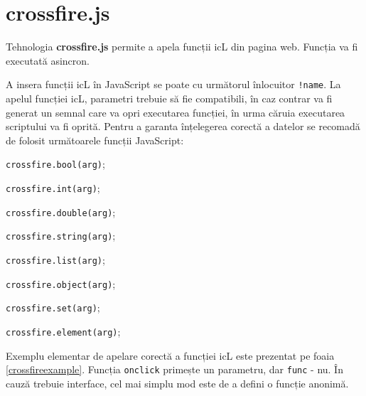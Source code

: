 \section{crossfire.js}

Tehnologia {\bf crossfire.js} permite a apela funcții icL din pagina web. Funcția va fi executată asincron.

A insera funcții icL în JavaScript se poate cu următorul înlocuitor \texttt{!{name}}. La apelul funcției icL, parametri trebuie să fie compatibili, în caz contrar va fi generat un semnal care va opri executarea funcției, în urma căruia executarea scriptului va fi oprită. Pentru a garanta înțelegerea corectă a datelor se recomadă de folosit următoarele funcții JavaScript:
\begin{icItems}
	\item \texttt{crossfire.bool(arg)};
	\item \texttt{crossfire.int(arg)};
	\item \texttt{crossfire.double(arg)};
	\item \texttt{crossfire.string(arg)};
	\item \texttt{crossfire.list(arg)};
	\item \texttt{crossfire.object(arg)};
	\item \texttt{crossfire.set(arg)};
	\item \texttt{crossfire.element(arg)};
\end{icItems}

Exemplu elementar de apelare corectă a funcției icL este prezentat pe foaia \ref{crossfireexample}. Funcția \texttt{onclick} primește un parametru, dar \texttt{func} - nu. În cauză trebuie interface, cel mai simplu mod este de a defini o funcție anonimă.

\begin{sourcecode}
    \label{crossfireexample}
    \inputminted[linenos]{icl}{../sources/crossfireexample.icL}
\end{sourcecode}

